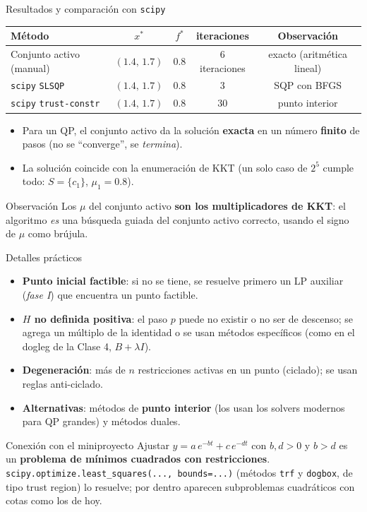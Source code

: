 \documentclass[aspectratio=169]{beamer}
\begin{document}
\begin{frame}{Resultados y comparación con \texttt{scipy}}
  \begin{center}\small
  \begin{tabular}{lcccc}
    \toprule
    Método & $x^\ast$ & $f^\ast$ & iteraciones & Observación\\
    \midrule
    Conjunto activo (manual) & $(1.4,\,1.7)$ & 0.8 & 6 iteraciones & exacto (aritmética lineal)\\
    \texttt{scipy} \texttt{SLSQP} & $(1.4,\,1.7)$ & 0.8 & 3 & SQP con BFGS\\
    \texttt{scipy} \texttt{trust-constr} & $(1.4,\,1.7)$ & 0.8 & 30 & punto interior\\
    \bottomrule
  \end{tabular}
  \end{center}
  \begin{itemize}
    \item Para un QP, el conjunto activo da la solución \textbf{exacta} en un número \textbf{finito} de pasos (no se ``converge'', se \emph{termina}).
    \item La solución coincide con la enumeración de KKT (un solo caso de $2^5$ cumple todo: $S=\{c_1\}$, $\mu_1=0.8$).
  \end{itemize}
  \begin{alertblock}{Observación}
    Los $\mu$ del conjunto activo \textbf{son los multiplicadores de KKT}: el algoritmo \emph{es} una búsqueda guiada del conjunto activo correcto, usando el signo de $\mu$ como brújula.
  \end{alertblock}
\end{frame}

\begin{frame}{Detalles prácticos}
  \begin{itemize}
    \item \textbf{Punto inicial factible}: si no se tiene, se resuelve primero un LP auxiliar (\emph{fase I}) que encuentra un punto factible.
    \item \textbf{$H$ no definida positiva}: el paso $p$ puede no existir o no ser de descenso; se agrega un múltiplo de la identidad o se usan métodos específicos (como en el dogleg de la Clase 4, $B+\lambda I$).
    \item \textbf{Degeneración}: más de $n$ restricciones activas en un punto (ciclado); se usan reglas anti-ciclado.
    \item \textbf{Alternativas}: métodos de \textbf{punto interior} (los usan los solvers modernos para QP grandes) y métodos duales.
  \end{itemize}
  \begin{exampleblock}{Conexión con el miniproyecto}
    Ajustar $y=a\,e^{-bt}+c\,e^{-dt}$ con $b,d>0$ y $b>d$ es un \textbf{problema de mínimos cuadrados con restricciones}. \texttt{scipy.optimize.least\_squares(..., bounds=...)} (métodos \texttt{trf} y \texttt{dogbox}, de tipo trust region) lo resuelve; por dentro aparecen subproblemas cuadráticos con cotas como los de hoy.
  \end{exampleblock}
\end{frame}
\end{document}
